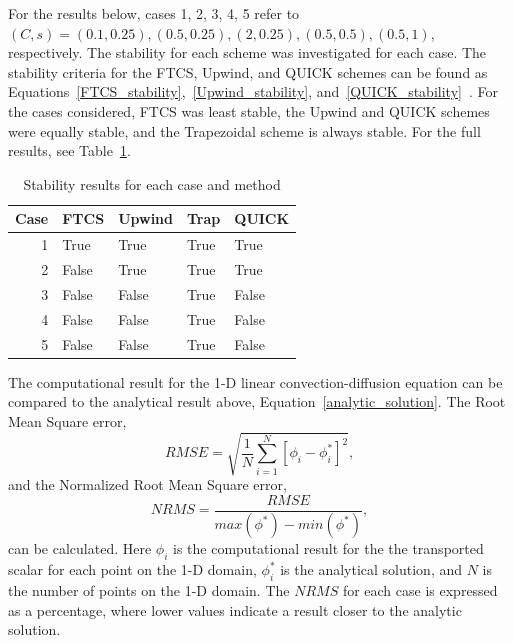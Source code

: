 \documentclass[twocolumn,10pt]{asme2ej}
\begin{document}
For the results below, cases 1, 2, 3, 4, 5 refer to $(C, s) = (0.1, 0.25), (0.5, 0.25), (2, 0.25), (0.5, 0.5), (0.5, 1)$, respectively. The stability for each scheme was investigated for each case. The stability criteria for the FTCS, Upwind, and QUICK schemes can be found as Equations~\ref{FTCS_stability},~\ref{Upwind_stability}, and~\ref{QUICK_stability}~\cite{LectureA}. For the cases considered, FTCS was least stable, the Upwind and QUICK schemes were equally stable, and the Trapezoidal scheme is always stable. For the full results, see Table~\ref{stability_table}.

\begin{table}[htb]
\begin{center}
\begin{tabular}{|r | l l l l|}
\hline
Case & FTCS & Upwind & Trap & QUICK  \\
\hline
1 & True  & True  & True & True  \\
2 & False & True  & True & True  \\
3 & False & False & True & False \\
4 & False & False & True & False \\
5 & False & False & True & False \\
\hline
\end{tabular}
\caption{Stability results for each case and method}
\label{stability_table}
\end{center}
\end{table}

The computational result for the 1-D linear convection-diffusion equation can be compared to the analytical result above, Equation~\ref{analytic_solution}. The Root Mean Square error,
\begin{equation}
RMSE = \sqrt{\frac{1}{N}\sum\limits_{i=1}^N[\phi_i - \phi^*_i]^2},
\end{equation}
and the Normalized Root Mean Square error,
\begin{equation}
NRMS = \dfrac{RMSE}{max(\phi^*)-min(\phi^*)},
\end{equation}
can be calculated. Here $\phi_i$ is the computational result for the the transported scalar for each point on the 1-D domain, $\phi^*_i$ is the analytical solution, and $N$ is the number of points on the 1-D domain. The $NRMS$ for each case is expressed as a percentage, where lower values indicate a result closer to the analytic solution.
\end{document}
